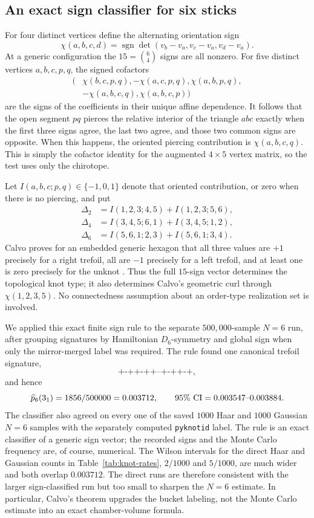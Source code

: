 \documentclass[11pt]{amsart}
\theoremstyle{remark}
\newcommand{\1}{\mathbf{1}}
\begin{document}
\subsection{An exact sign classifier for six sticks}

For four distinct vertices define the alternating orientation sign
\[
 \chi(a,b,c,d)
 =
 \operatorname{sgn}\det(v_b-v_a,v_c-v_a,v_d-v_a).
\]
At a generic configuration the \(15=\binom64\) signs are all nonzero.
For five distinct vertices \(a,b,c,p,q\), the signed cofactors
\[
\begin{split}
(&\chi(b,c,p,q),-\chi(a,c,p,q),\chi(a,b,p,q),\\
 &-\chi(a,b,c,q),\chi(a,b,c,p))
\end{split}
\]
are the signs of the coefficients in their unique affine dependence.
It follows that the open segment \(pq\) pierces the relative interior of
the triangle \(abc\) exactly when the first three signs agree, the last
two agree, and those two common signs are opposite.  When this happens,
the oriented piercing contribution is \(\chi(a,b,c,q)\).  This is simply
the cofactor identity for the augmented \(4\times5\) vertex matrix, so the
test uses only the chirotope.

Let \(I(a,b,c;p,q)\in\{-1,0,1\}\) denote that oriented contribution, or
zero when there is no piercing, and put
\[
\begin{aligned}
 \Delta_2&=I(1,2,3;4,5)+I(1,2,3;5,6),\\
 \Delta_4&=I(3,4,5;6,1)+I(3,4,5;1,2),\\
 \Delta_6&=I(5,6,1;2,3)+I(5,6,1;3,4).
\end{aligned}
\]
Calvo proves for an embedded generic hexagon that all three values are
\(+1\) precisely for a right trefoil, all are \(-1\) precisely for a left
trefoil, and at least one is zero precisely for the unknot
\cite{Calvo}.  Thus the full \(15\)-sign vector determines the topological
knot type; it also determines Calvo's geometric curl through
\(\chi(1,2,3,5)\).  No connectedness assumption about an order-type
realization set is involved.

We applied this exact finite sign rule to the separate \(500{,}000\)-sample
\(N=6\) run, after grouping signatures by Hamiltonian \(D_6\)-symmetry and
global sign when only the mirror-merged label was required.  The rule found
one canonical trefoil signature,
\[
 \texttt{+-++-++--+-++-+},
\]
and hence
\[
    \widehat p_6(3_1)=1856/500000=0.003712,
    \qquad
    95\%\ {\rm CI}=0.003547\text{--}0.003884.
\]
The classifier also agreed on every one of the saved \(1000\) Haar and
\(1000\) Gaussian \(N=6\) samples with the separately computed \texttt{pyknotid}
label.  The rule is an exact classifier of a generic sign vector; the
recorded signs and the Monte Carlo frequency are, of course, numerical.
The Wilson intervals for the direct Haar and Gaussian counts in
Table~\ref{tab:knot-rates}, \(2/1000\) and \(5/1000\), are much wider and both overlap
\(0.003712\).  The direct runs are therefore consistent with the larger sign-classified run but too
small to sharpen the \(N=6\) estimate.  In particular, Calvo's theorem upgrades
the bucket labeling, not the Monte Carlo estimate into an exact chamber-volume formula.
\end{document}
